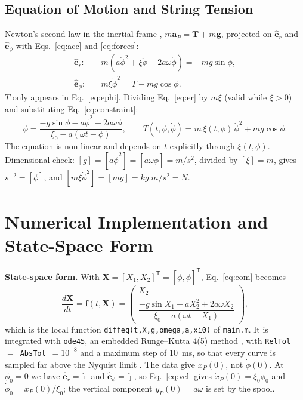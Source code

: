 \documentclass[11pt,a4paper]{article}
\numberwithin{equation}{section}
\newcommand{\er}{\hat{\mathbf{e}}_r}
\newcommand{\ephi}{\hat{\mathbf{e}}_\phi}
\newcommand{\ii}{\hat{\boldsymbol{\imath}}}
\newcommand{\jj}{\hat{\boldsymbol{\jmath}}}
\newcommand{\vect}[1]{\mathbf{#1}}
\begin{document}
\subsection{Equation of Motion and String Tension}

Newton's second law in the inertial frame \cite{greenwood,meriam}, $m\vect a_P=\vect T+m\vect g$, projected on $\er$ and $\ephi$ with Eqs.~\eqref{eq:acc} and \eqref{eq:forces}:
\begin{align}
  \er:&\quad m\left(a\dot\phi^2 + \xi\ddot\phi - 2a\omega\dot\phi\right) = -mg\sin\phi, \label{eq:er}\\
  \ephi:&\quad m\xi\dot\phi^2 = T - mg\cos\phi. \label{eq:ephi}
\end{align}
$T$ only appears in Eq.~\eqref{eq:ephi}. Dividing Eq.~\eqref{eq:er} by $m\xi$ (valid while $\xi>0$) and substituting Eq.~\eqref{eq:constraint}:
\begin{equation}
  \boxed{\ddot\phi = \frac{-g\sin\phi - a\dot\phi^2 + 2a\omega\dot\phi}{\xi_0 - a(\omega t - \phi)}},\qquad
  \boxed{T(t,\phi,\dot\phi) = m\,\xi(t,\phi)\,\dot\phi^2 + mg\cos\phi}. \label{eq:eom}
\end{equation}
The equation is non-linear and depends on $t$ explicitly through $\xi(t,\phi)$. Dimensional check: $[g]=[a\dot\phi^2]=[a\omega\dot\phi]=\si{m/s^2}$, divided by $[\xi]=\si{m}$, gives $\si{s^{-2}}=[\ddot\phi]$, and $[m\xi\dot\phi^2]=[mg]=\si{kg.m/s^2}=\si{N}$.

\section{Numerical Implementation and State-Space Form}

\textbf{State-space form.} With $\vect X=[X_1,X_2]^{\mathsf T}=[\phi,\dot\phi]^{\mathsf T}$, Eq.~\eqref{eq:eom} becomes
\begin{equation}
  \frac{d\vect X}{dt} = \vect f(t,\vect X) =
  \begin{pmatrix} X_2 \\[2pt] \dfrac{-g\sin X_1 - aX_2^2 + 2a\omega X_2}{\xi_0 - a(\omega t - X_1)}\end{pmatrix}, \label{eq:ss}
\end{equation}
which is the local function \texttt{diffeq(t,X,g,omega,a,xi0)} of \texttt{main.m}. It is integrated with \texttt{ode45}, an embedded Runge--Kutta 4(5) method \cite{dormand_prince,shampine_reichelt}, with \texttt{RelTol}~$=$~\texttt{AbsTol}~$=10^{-8}$ and a maximum step of \SI{10}{ms}, so that every curve is sampled far above the Nyquist limit \cite{uc3m_guidelines}. The data give $\dot x_P(0)$, not $\dot\phi(0)$. At $\phi_0=0$ we have $\er=\ii$ and $\ephi=\jj$, so Eq.~\eqref{eq:vel} gives $\dot x_P(0)=\xi_0\dot\phi_0$ and $\dot\phi_0=\dot x_P(0)/\xi_0$; the vertical component $\dot y_P(0)=a\omega$ is set by the spool.
\end{document}
